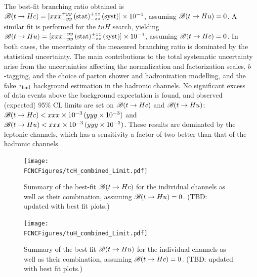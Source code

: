 The best-fit branching ratio obtained is $\mathscr{B}(t\to Hc)=[xxx^{+yy}_{-yy}\,(\mathrm{stat})^{+zz}_{-zz}\,(\mathrm{syst})] \times 10^{-4}$, assuming $\mathscr{B}(t\to Hu)=0$. 
A similar fit is performed for the $tuH$ search, yielding $\mathscr{B}(t\to Hu)=[xxx^{+yy}_{-yy}\,(\mathrm{stat})^{+zz}_{-zz}\,(\mathrm{syst})] \times 10^{-4}$,
assuming $\mathscr{B}(t\to Hc)=0$.
In both cases, the uncertainty of the measured branching ratio is dominated by the statistical uncertainty.
The main contributions to the total systematic uncertainty arise from the uncertainties affecting the normalization and factorization scales, $b$-tagging, and the choice of
parton shower and hadronization modelling, and the fake $\tau_{\mathrm{had}}$ background estimation in the hadronic channels.
No significant excess of data events above the background expectation is found, 
and observed (expected) 95\% CL limits are set on $\mathscr{B}(t\to Hc)$ and $\mathscr{B}(t\to Hu)$:
$\mathscr{B}(t\to Hc)<xxx \times 10^{-3}\,(yyy \times 10^{-3})$ and $\mathscr{B}(t\to Hu)<xxx \times 10^{-3}\,(yyy \times 10^{-3})$.
These results are dominated by the leptonic channels, which has a sensitivity a factor of two better than that of the hadronic channels.

\begin{figure}[t!]
\begin{center}
\texttt{[image: \\FCNCFigures/tcH\_combined\_Limit.pdf]}
\caption{\small {Summary of the best-fit $\mathscr{B}(t\to Hc)$ for the individual channels as well as their combination,
assuming $\mathscr{B}(t\to Hu)=0$. (TBD: updated with best fit plots.)}}
\label{fig:summary_printnum_hc} 
\end{center}
\end{figure}
\begin{figure}[h!]
\begin{center}
\texttt{[image: \\FCNCFigures/tuH\_combined\_Limit.pdf]}
\caption{\small {Summary of the best-fit $\mathscr{B}(t\to Hu)$ for the individual channels as well as their combination,
assuming $\mathscr{B}(t\to Hc)=0$. (TBD: updated with best fit plots.)}}
\label{fig:summary_printnum_hu} 
\end{center}
\end{figure}

